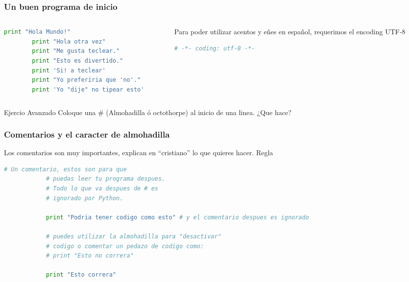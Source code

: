 \documentclass[]{beamer}
\begin{document}
\begin{frame}[fragile]
	\frametitle{Un buen programa de inicio}
	\begin{columns}[T] %
	\begin{column}[]{5cm}
		
		\begin{lstlisting}[language=Python,inputencoding=utf8, 
		basicstyle=\ttfamily\small, 
		keywordstyle=\color{keywords},
		commentstyle=\color{comments},
		stringstyle=\color{red},
		showstringspaces=false,
		identifierstyle=\color{green},caption= mi primer programa]
		print "Hola Mundo!" 
		print "Hola otra vez"
		print "Me gusta teclear."
		print "Esto es divertido."
		print 'Si! a teclear'
		print "Yo preferiria que 'no'."
		print 'Yo "dije" no tipear esto'
		\end{lstlisting}
	\end{column}
	\begin{column}[]{5cm}
		Para poder utilizar acentos y eñes en español, requerimos el encoding UTF-8
		\begin{lstlisting}[language=Python, 
		basicstyle=\ttfamily\small, 
		keywordstyle=\color{keywords},
		commentstyle=\color{comments},
		stringstyle=\color{red},
		showstringspaces=false,
		identifierstyle=\color{green},caption= preambulo en python]
		# -*- coding: utf-8 -*-
		\end{lstlisting}
		
	\end{column}
	\end{columns}
	\begin{block}{Ejercio Avanzado}
	Coloque una	\# (Almohadilla ó octothorpe) al inicio de una linea. ¿Que hace?
	\end{block}
\end{frame}	
\begin{frame}[fragile]
	\frametitle{Comentarios y el caracter de almohadilla}
	Los comentarios son muy importantes, explican en ``cristiano'' lo que quieres hacer. \alert{Regla}
			\begin{lstlisting}[language=Python,inputencoding=utf8, 
			basicstyle=\ttfamily\small, 
			keywordstyle=\color{keywords},
			commentstyle=\color{comments},
			stringstyle=\color{red},
			showstringspaces=false,
			identifierstyle=\color{green},caption= comentarios]
			# Un comentario, estos son para que 
			# puedas leer tu programa despues.
			# Todo lo que va despues de # es 
			# ignorado por Python.
			
			print "Podria tener codigo como esto" # y el comentario despues es ignorado
			
			# puedes utilizar la almohadilla para "desactivar" 
			# codigo o comentar un pedazo de codigo como:
			# print "Esto no correra"
			
			print "Esto correra"
			\end{lstlisting}		
\end{frame}
\end{document}
